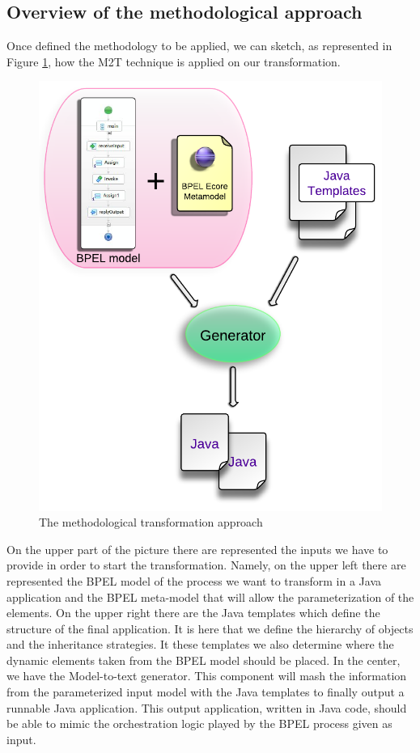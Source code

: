 \subsection{Overview of the methodological approach}
\label{MethodologyOverview}
Once defined the methodology to be applied, we can sketch, as represented in Figure \ref{fig:TransformationApproach}, how the M2T technique is applied on our transformation.
\begin{figure}[h]
  \begin{center}
    \includegraphics[scale=0.9]{pictures/TransformationApproach.png}
    \caption{The methodological transformation approach}
    \label{fig:TransformationApproach}
  \end{center}
\end{figure}
On the upper part of the picture there are represented the inputs we have to provide in order to start the transformation. Namely, on the upper left there are represented the BPEL model of the process we want to transform in a Java application and the BPEL meta-model that will allow the parameterization of the elements. 
On the upper right there are the Java templates which define the structure of the final application. It is here that we define the hierarchy of objects and the inheritance strategies. It these templates we also determine where the dynamic elements taken from the BPEL model should be placed.  
In the center, we have the Model-to-text generator. This component will mash the information from the parameterized input model with the Java templates to finally output a runnable Java application. This output application, written in Java code, should be able to mimic the orchestration logic played by the BPEL process given as input.  





